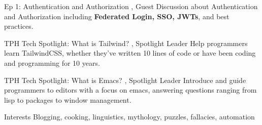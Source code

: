 

\begin{cventries}


  \cventrynoposition
    {Ep 1: Authentication and Authorization} %
    {, Guest}
    {}
    {Discussion about Authentication and Authorization including \textbf{Federated Login, SSO, JWTs}, and best practices.}

\cventrynoposition
    {TPH Tech Spotlight: What is Tailwind?} %
    {, Spotlight Leader}
    {}
    {Help programmers learn TailwindCSS, whether they've written 10 lines of code or have been coding and programming for 10 years.}

\cventrynoposition
    {TPH Tech Spotlight: What is Emacs?} %
    {, Spotlight Leader}
    {}
    {Introduce and guide programmers to editors with a focus on emacs, answering questions ranging from lisp to packages to window management.}

\cventrynoposition
    {Interests} %
    {}
    {}
    {Blogging, cooking, linguistics, mythology, puzzles, fallacies, automation}


\end{cventries}
